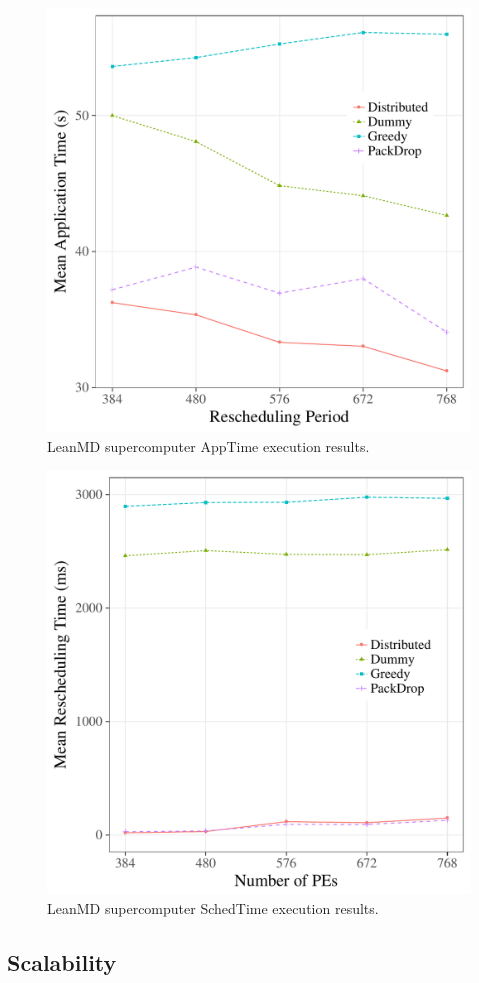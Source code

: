 \begin{figure}[!ht]
 \centering
 \includegraphics[width=0.9\linewidth]{images/apptime_leanmd_sdumont.pdf}
 \caption{LeanMD supercomputer AppTime execution results.}
 \label{fig:eval:sdumont:leanmd:apptime}
\end{figure}


\begin{figure}
	\centering
	\includegraphics[width=0.9\linewidth]{images/schedtime_leanmd_sdumont.pdf}
	\caption{LeanMD supercomputer SchedTime execution results.}
	\label{fig:eval:sdumont:leanmd:schedtime}
\end{figure}


\subsection{Scalability}